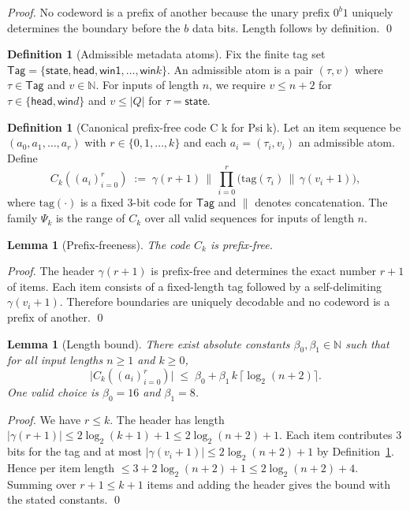 \documentclass[11pt]{article}
\newtheorem{lemma}[theorem]{Lemma}
\theoremstyle{plain}
\theoremstyle{definition}
\newtheorem{definition}[theorem]{Definition}
\newcommand{\PSi}{\Psi}
\begin{document}
\begin{proof}
No codeword is a prefix of another because the unary prefix $0^{b}1$ uniquely determines the boundary before the $b$ data bits. Length follows by definition. \qed
\end{proof}

\begin{definition}[Admissible metadata atoms]
\label{def:atoms}
Fix the finite tag set $\mathsf{Tag}=\{\textsf{state},\textsf{head},\textsf{win1},\ldots,\textsf{win}k\}$. An admissible atom is a pair $(\tau, v)$ where $\tau\in\mathsf{Tag}$ and $v\in\mathbb{N}$. For inputs of length $n$, we require $v\le n+2$ for $\tau\in\{\textsf{head},\textsf{win}d\}$ and $v\le |Q|$ for $\tau=\textsf{state}$.
\end{definition}

\begin{definition}[Canonical prefix-free code C k for Psi k]
\label{def:psi-k}
Let an item sequence be $(a_0,a_1,\ldots,a_r)$ with $r\in\{0,1,\ldots,k\}$ and each $a_i=(\tau_i,v_i)$ an admissible atom. Define
\[
C_k((a_i)_{i=0}^r)\;:=\; \gamma(r+1)\,\big\|\,\prod_{i=0}^{r}\Big(\mathrm{tag}(\tau_i)\,\big\|\,\gamma(v_i+1)\Big),
\]
where $\mathrm{tag}(\cdot)$ is a fixed 3-bit code for $\mathsf{Tag}$ and $\|$ denotes concatenation. The family $\PSi_k$ is the range of $C_k$ over all valid sequences for inputs of length $n$.
\end{definition}

\begin{lemma}[Prefix-freeness]
\label{lem:prefixfree}
The code $C_k$ is prefix-free.
\end{lemma}

\begin{proof}
The header $\gamma(r+1)$ is prefix-free and determines the exact number $r+1$ of items. Each item consists of a fixed-length tag followed by a self-delimiting $\gamma(v_i+1)$. Therefore boundaries are uniquely decodable and no codeword is a prefix of another. \qed
\end{proof}

\begin{lemma}[Length bound]
\label{lem:length-bound}
There exist absolute constants $\beta_0,\beta_1\in\mathbb{N}$ such that for all input lengths $n\ge1$ and $k\ge0$,
\[
\big|C_k((a_i)_{i=0}^{r})\big|\;\le\; \beta_0 + \beta_1\,k\,\lceil\log_2(n+2)\rceil.
\]
One valid choice is $\beta_0=16$ and $\beta_1=8$.
\end{lemma}

\begin{proof}
We have $r\le k$. The header has length $|\gamma(r+1)|\le 2\log_2(k+1)+1\le 2\log_2(n+2)+1$. Each item contributes $3$ bits for the tag and at most $|\gamma(v_i+1)|\le 2\log_2(n+2)+1$ by Definition~\ref{def:atoms}. Hence per item length $\le 3+2\log_2(n+2)+1\le 2\log_2(n+2)+4$. Summing over $r+1\le k+1$ items and adding the header gives the bound with the stated constants. \qed
\end{proof}
\end{document}
